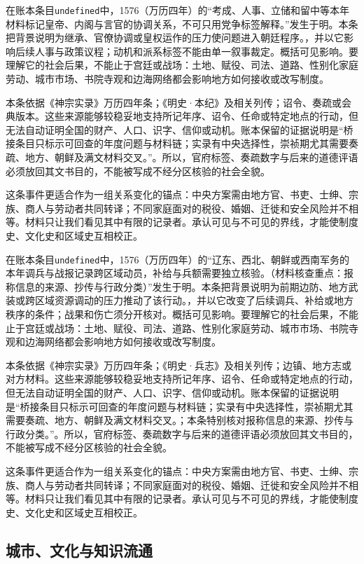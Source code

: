 在账本条目\texttt{undefined}中，1576（万历四年）的“考成、人事、立储和留中等本年材料标记皇帝、内阁与言官的协调关系，不可只用党争标签解释。”发生于明。本条把背景说明为继承、官僚协调或皇权运作的压力使问题进入朝廷程序。，并以它影响后续人事与政策议程；动机和派系标签不能由单一叙事裁定。概括可见影响。要理解它的社会后果，不能止于宫廷或战场：土地、赋役、司法、道路、性别化家庭劳动、城市市场、书院寺观和边海网络都会影响地方如何接收或改写制度。

本条依据《神宗实录》万历四年条；《明史·本纪》及相关列传；诏令、奏疏或会典版本。这些来源能够较稳妥地支持所记年序、诏令、任命或特定地点的行动，但无法自动证明全国的财产、人口、识字、信仰或动机。账本保留的证据说明是“桥接条目只标示可回查的年度问题与材料链；实录有中央选择性，崇祯期尤其需要奏疏、地方、朝鲜及满文材料交叉。”。所以，官府标签、奏疏数字与后来的道德评语必须放回其文书目的，不能被写成不经分区核验的社会全貌。

这条事件更适合作为一组关系变化的锚点：中央方案需由地方官、书吏、士绅、宗族、商人与劳动者共同转译；不同家庭面对的税役、婚姻、迁徙和安全风险并不相等。材料只让我们看见其中有限的记录者。承认可见与不可见的界线，才能使制度史、文化史和区域史互相校正。

在账本条目\texttt{undefined}中，1576（万历四年）的“辽东、西北、朝鲜或西南军务的本年调兵与战报记录跨区域动员，补给与兵额需要独立核验。（材料核查重点：报称信息的来源、抄传与行政分类）”发生于明。本条把背景说明为前期边防、地方武装或跨区域资源调动的压力推动了该行动。，并以它改变了后续调兵、补给或地方秩序的条件；战果和伤亡须分开核对。概括可见影响。要理解它的社会后果，不能止于宫廷或战场：土地、赋役、司法、道路、性别化家庭劳动、城市市场、书院寺观和边海网络都会影响地方如何接收或改写制度。

本条依据《神宗实录》万历四年条；《明史·兵志》及相关列传；边镇、地方志或对方材料。这些来源能够较稳妥地支持所记年序、诏令、任命或特定地点的行动，但无法自动证明全国的财产、人口、识字、信仰或动机。账本保留的证据说明是“桥接条目只标示可回查的年度问题与材料链；实录有中央选择性，崇祯期尤其需要奏疏、地方、朝鲜及满文材料交叉。；本条特别核对报称信息的来源、抄传与行政分类。”。所以，官府标签、奏疏数字与后来的道德评语必须放回其文书目的，不能被写成不经分区核验的社会全貌。

这条事件更适合作为一组关系变化的锚点：中央方案需由地方官、书吏、士绅、宗族、商人与劳动者共同转译；不同家庭面对的税役、婚姻、迁徙和安全风险并不相等。材料只让我们看见其中有限的记录者。承认可见与不可见的界线，才能使制度史、文化史和区域史互相校正。

\subsection{城市、文化与知识流通}

